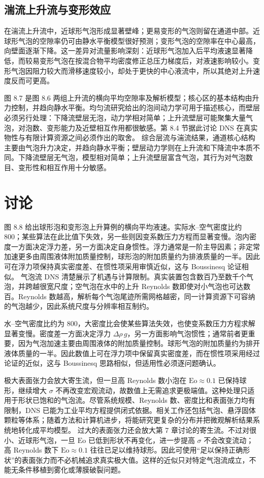 \documentclass[11pt,a4paper,openany,fontset=none]{ctexbook}
\begin{document}
\subsection{湍流上升流与变形效应}

在湍流上升流中，近球形气泡形成显著壁峰；更易变形的气泡则留在通道中部。近球形气泡的空隙率仍可由静水平衡模型很好预测；变形气泡的空隙率在中心最高，向壁面逐渐下降。这一差异对流量影响深刻：近球形气泡加入后平均液速显著降低，而较易变形气泡在按混合物平均密度修正总压力梯度后，对液速影响较小。变形气泡因阻力较大而滑移速度较小，却处于更快的中心液流中，所以其绝对上升速度反而可更高。

图 8.7 是图 8.6 两组上升流的横向平均空隙率及解析模型；核心区的基本结构由升力控制，并趋向静水平衡。均匀流研究给出的泡间动力学可用于描述核心，而壁层必须另行处理：下降流壁层无泡，动力学相对简单；上升流壁层可能聚集大量气泡，对泡数、变形能力及近壁相互作用都很敏感。第 8.4 节据此讨论 DNS 在真实物性与有限计算资源之间必须作出的取舍。
综合层流与湍流结果，通道核心结构主要由气泡升力决定，并趋向静水平衡；壁层动力学则在上升流和下降流中本质不同。下降流壁层无气泡，模型相对简单；上升流壁层富含气泡，其行为对气泡数目、变形性和相互作用十分敏感。

\section{讨论}

图 8.8 给出球形泡和变形泡上升算例的横向平均液速。实际水--空气密度比约 800；某些算法在此比值下失效，另一些则因变系数压力方程而显著变慢。泡内密度一方面决定浮力差，另一方面决定自身惯性。浮力通常是一阶主导因素；非定常加速更多由周围液体附加质量控制，球形泡的附加质量约为排液质量的一半。因此可在浮力项保持真实密度差、在惯性项采用审慎近似，这与 Boussinesq 论证相似。
气泡流 DNS 清楚展示了机遇与计算限制。真实装置包含数百乃至数千个气泡，并跨越很宽尺度；空气泡在水中的上升 Reynolds 数即使对小气泡也可达数百。Reynolds 数越高，解析每个气泡尾迹所需网格越密，同一计算资源下可容纳的气泡越少，因此系统尺度与分辨率相互制约。

水--空气密度比约为 $800$，大密度比会使某些算法失效，也使变系数压力方程求解显著变慢。密度差一方面决定浮力 $\Delta\rho\,g$，另一方面影响气泡惯性；通常前者更重要，因为气泡加速主要由周围液体的附加质量控制。球形气泡的附加质量约为排开液体质量的一半。因此数值上可在浮力项中保留真实密度差，而在惯性项采用经过论证的近似，这与 Boussinesq 思路相似，但适用性必须逐问题确认。

极大表面张力会放大寄生流，但一旦高 Reynolds 数小泡在 $\mathrm{Eo}\approx0.1$ 已保持球形，继续增大 $\sigma$ 不再改变宏观流动，故数值上无需追求更极端值。这种处理只适用于形状已饱和的气泡流。尽管系统规模、Reynolds 数、密度比和表面张力均有限制，DNS 已能为工业平均方程提供闭式依据。相关工作还包括气泡、悬浮固体颗粒等体系；随着方法和计算机进步，将能研究更复杂的分布并把微观解析结果系统地转化成平均模型。
过大的表面张力还会放大第 7 章讨论的寄生流。不过对很小、近球形气泡，一旦 $\mathrm{Eo}$ 已低到形状不再变化，进一步提高 $\sigma$ 不会改变流动；高 Reynolds 数下 $\mathrm{Eo}\approx0.1$ 往往已足以维持球形。因此可使用“足以保持正确形状”的表面张力而不必机械追求真实极大值。这样的近似只对特定气泡流成立，不能无条件移植到雾化或薄膜破裂问题。
\end{document}
